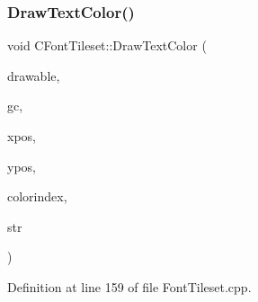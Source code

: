 \subsubsection{\texorpdfstring{Draw\+Text\+Color()}{DrawTextColor()}}
{\footnotesize\ttfamily void C\+Font\+Tileset\+::\+Draw\+Text\+Color (\begin{DoxyParamCaption}\item[{Gdk\+Drawable $\ast$}]{drawable,  }\item[{Gdk\+GC $\ast$}]{gc,  }\item[{gint}]{xpos,  }\item[{gint}]{ypos,  }\item[{int}]{colorindex,  }\item[{const std\+::string \&}]{str }\end{DoxyParamCaption})}



Definition at line 159 of file Font\+Tileset.\+cpp.


